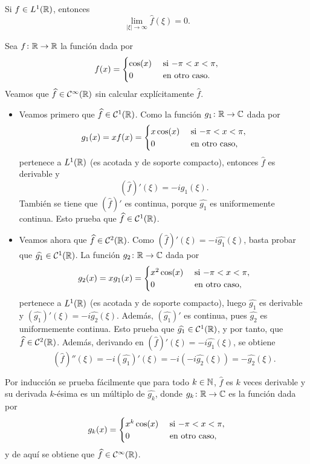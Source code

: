 \documentclass[a4paper, 12pt, extrafontsizes]{memoir}
\begin{document}
\begin{theorem}
    Si $f \in L^1(\mathbb R)$, entonces
    \[\lim_{|\xi| \to \infty} \widehat{f}(\xi) = 0.\]
\end{theorem}

\begin{example}
    Sea $f \colon \mathbb R \to \mathbb R$ la función dada por
    \[f(x)=\begin{cases}
        \cos(x) & $ si $ -\pi < x < \pi, \\
        0 & $ en otro caso$.
    \end{cases}\]
    Veamos que $\widehat{f} \in \mathcal{C}^\infty(\mathbb R)$ sin calcular explícitamente $\widehat{f}$. 
    \begin{itemize}
        \item Veamos primero que $\widehat{f} \in \mathcal{C}^1(\mathbb R)$. Como la función $g_1 \colon \mathbb R \to \mathbb C$ dada por
        \[g_1(x)=xf(x) = \begin{cases}
            x\cos(x) & $ si $ -\pi < x < \pi, \\
            0 & $ en otro caso$,
        \end{cases}\]
        pertenece a $L^1(\mathbb R)$ (es acotada y de soporte compacto), entonces $\widehat{f}$ es derivable y \[(\widehat{f})'(\xi) = -i\widehat{g_1}(\xi).\] También se tiene que $(\widehat{f})'$ es continua, porque $\widehat{g_1}$ es uniformemente continua. Esto prueba que $\widehat{f} \in \mathcal{C}^1(\mathbb R)$.
        \item Veamos ahora que $\widehat{f} \in \mathcal{C}^2(\mathbb R)$. Como $(\widehat{f})'(\xi) = -i\widehat{g_1}(\xi)$, basta probar que $\widehat{g_1} \in \mathcal{C}^1(\mathbb R)$. La función $g_2 \colon \mathbb R \to \mathbb C$ dada por
        \[g_2(x)=xg_1(x) = \begin{cases}
            x^2\cos(x) & $ si $ -\pi < x < \pi, \\
            0 & $ en otro caso$,
        \end{cases}\]
        pertenece a $L^1(\mathbb R)$ (es acotada y de soporte compacto), luego $\widehat{g_1}$ es derivable y $(\widehat{g_1})'(\xi) = -i\widehat{g_2}(\xi)$. Además, $(\widehat{g_1})'$ es continua, pues $\widehat{g_2}$ es uniformemente continua. Esto prueba que $\widehat{g_1} \in \mathcal{C}^1(\mathbb R)$, y por tanto, que $\widehat{f} \in \mathcal{C}^2(\mathbb R)$. Además, derivando en $(\widehat{f})'(\xi) = -i\widehat{g_1}(\xi)$, se obtiene
        \[(\widehat{f})''(\xi) = -i(\widehat{g_1})'(\xi) =-i(-i\widehat{g_2}(\xi))= -\widehat{g_2}(\xi).\]
    \end{itemize}
    Por inducción se prueba fácilmente que para todo $k \in \mathbb N$, $\widehat{f}$ es $k$ veces derivable y su derivada $k$-ésima es un múltiplo de $\widehat{g_k}$, donde $g_k \colon \mathbb R \to \mathbb C$ es la función dada por 
    \[g_k(x) = \begin{cases}
        x^k\cos(x) & $ si $ -\pi < x < \pi, \\
        0 & $ en otro caso$,
    \end{cases}\]
    y de aquí se obtiene que $\widehat{f} \in \mathcal{C}^\infty(\mathbb R)$.
\end{example}
\end{document}
